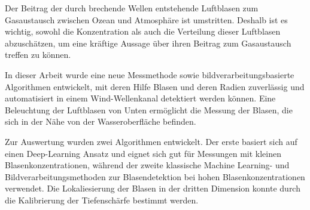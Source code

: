 Der Beitrag der durch brechende Wellen entstehende Luftblasen zum Gasaustausch zwischen Ozean und Atmosph\"are ist umstritten. Deshalb ist es wichtig, sowohl die Konzentration als auch die Verteilung dieser Luftblasen abzusch\"atzen, um eine kr\"aftige Aussage über ihren Beitrag zum Gasaustausch treffen zu k\"onnen. 

In dieser Arbeit wurde eine neue Messmethode sowie bildverarbeitungsbasierte Algorithmen entwickelt, mit deren Hilfe Blasen und deren Radien zuverlässig und automatisiert in einem Wind-Wellenkanal detektiert werden k\"onnen. Eine Beleuchtung der Luftblasen von Unten erm\"oglicht die Messung der Blasen, die sich in der Nähe von der Wasseroberfläche befinden. 

Zur Auswertung wurden zwei Algorithmen entwickelt. Der erste basiert sich auf einen Deep-Learning Ansatz und eignet sich gut f\"ur Messungen mit kleinen Blasenkonzentrationen, während der zweite klassische Machine Learning- und Bildverarbeitungsmethoden zur Blasendetektion bei hohen Blasenkonzentrationen verwendet. Die Lokaliesierung der Blasen in der dritten Dimension konnte durch die Kalibrierung der Tiefensch\"arfe bestimmt werden.  